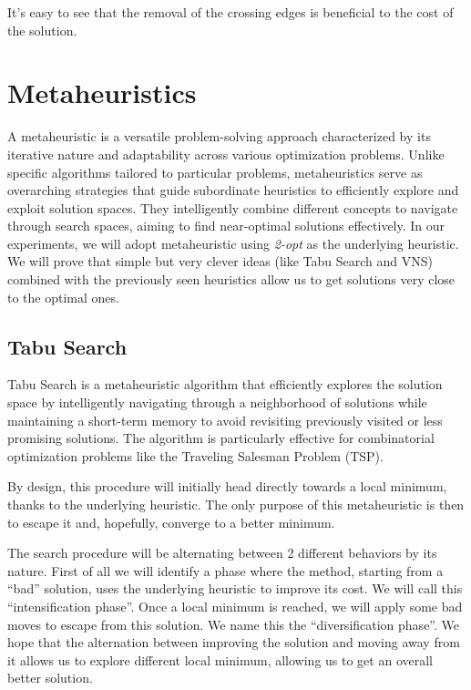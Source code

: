 \documentclass{article}
\begin{document}
It's easy to see that the removal of the crossing edges is beneficial to the
cost of the solution.

\section{Metaheuristics}
A metaheuristic is a versatile problem-solving approach characterized by its iterative nature and adaptability across various optimization problems. Unlike specific algorithms tailored to particular problems, metaheuristics serve as overarching strategies that guide subordinate heuristics to efficiently explore and exploit solution spaces. They intelligently combine different concepts to navigate through search spaces, aiming to find near-optimal solutions effectively.
In our experiments, we will adopt metaheuristic using \textit{2-opt} as the underlying
heuristic. We will prove that simple but very clever ideas (like Tabu Search and VNS) combined with the previously seen heuristics allow us to get solutions very close to the optimal ones.

\subsection{Tabu Search}
Tabu Search is a metaheuristic algorithm that efficiently explores the solution space by intelligently navigating through a neighborhood of solutions while maintaining a short-term memory to avoid revisiting previously visited or less promising solutions. The algorithm is particularly effective for combinatorial optimization problems like the Traveling Salesman Problem (TSP).

By design, this procedure will initially head directly towards a local minimum, thanks to the underlying heuristic. The only purpose of this metaheuristic is then to escape it and, hopefully, converge to a better minimum.

The search procedure will be alternating between 2 different behaviors by its nature. First of all
we will identify a phase where the method, starting from a ``bad'' solution, uses the underlying
heuristic to improve its cost. We will call this ``intensification phase''. Once a local minimum is reached, we will apply some bad moves to escape from this solution. We name this the ``diversification phase''. We hope that the alternation between improving the solution and moving
away from it allows us to explore different local minimum, allowing us to get an overall better
solution.
\end{document}
